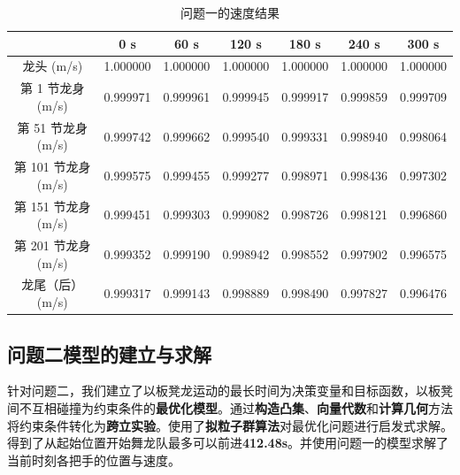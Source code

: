 \documentclass[a4paper]{article}
\begin{document}
		\begin{table}[H] %
		\captionsetup{skip=4pt} %
		\caption{问题一的速度结果}
		\centering
		\setlength{\arrayrulewidth}{0.5pt} %
		\begin{tabular}{|c|c|c|c|c|c|c|} %
			\hline
			& 0 s & 60 s & 120 s & 180 s & 240 s & 300 s \\ \hline
			龙头 (m/s)      &    1.000000 &	1.000000 &	1.000000 &	1.000000 &	1.000000 &	1.000000 \\ \hline
			第 1 节龙身 (m/s) &  0.999971 &	0.999961 &	0.999945 &	0.999917 &	0.999859 &	0.999709 \\ \hline
			第 51 节龙身 (m/s) & 0.999742 &	0.999662 &	0.999540 &	0.999331 &	0.998940 &	0.998064 \\ \hline
			第 101 节龙身 (m/s) &0.999575 &	0.999455 &	0.999277 &	0.998971 &	0.998436 &	0.997302 \\ \hline
			第 151 节龙身 (m/s) &0.999451 &	0.999303 &	0.999082 &	0.998726 &	0.998121 &	0.996860 \\ \hline
			第 201 节龙身 (m/s) &0.999352 &	0.999190 &	0.998942 &	0.998552 &	0.997902 &	0.996575 \\ \hline
			龙尾（后） (m/s) &   0.999317 &	0.999143 &	0.998889 &	0.998490 &	0.997827 &	0.996476 \\ \hline
		\end{tabular}
		\end{table}

	\subsection{问题二模型的建立与求解}
	     针对问题二，我们建立了以板凳龙运动的最长时间为决策变量和目标函数，以板凳间不互相碰撞为约束条件的\textbf{最优化模型}。通过\textbf{构造凸集}、\textbf{向量代数}和\textbf{计算几何}方法将约束条件转化为\textbf{跨立实验}。使用了\textbf{拟粒子群算法}对最优化问题进行启发式求解。得到了从起始位置开始舞龙队最多可以前进\textbf{412.48s}。并使用问题一的模型求解了当前时刻各把手的位置与速度。
\end{document}
